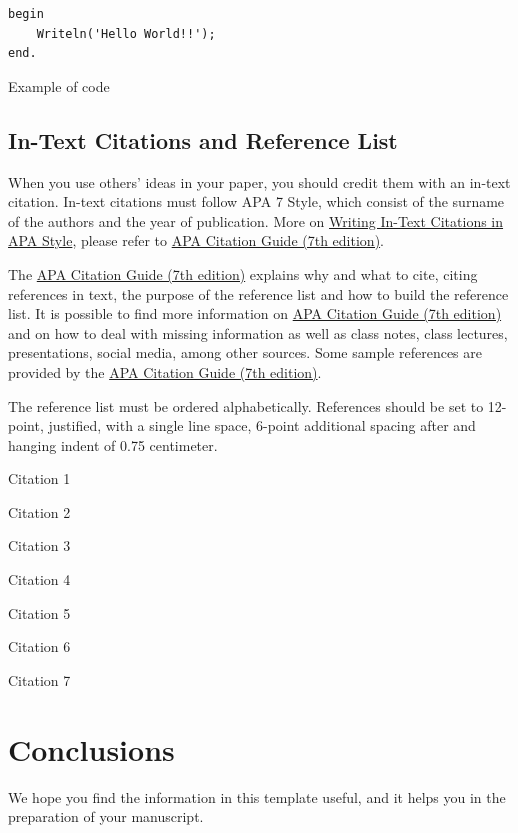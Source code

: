 \documentclass[english, spanish,brazilian]{RBIEarticle} %
\begin{document}
\begin{itemize}
\begin{code}[h]
	\begin{lstlisting}
begin
    Writeln('Hello World!!');
end.
	\end{lstlisting}
	\caption{Example of code}
	\label{code:one}
\end{code}


\subsection{In-Text Citations and Reference List}

When you use others' ideas in your paper, you should credit them with an in-text citation. In-text citations must follow APA 7 Style, which consist of the surname of the authors and the year of publication. More on \href{https://apastyle.apa.org/}{Writing In-Text Citations in APA Style}, please refer to \href{https://libguides.brenau.edu/APA7}{APA Citation Guide (7th edition)}.

The  \href{https://libguides.brenau.edu/APA7}{APA Citation Guide (7th edition)} explains why and what to cite, citing references in text, the purpose of the reference list and how to build the reference list. It is possible to find more information on  \href{https://libguides.brenau.edu/APA7}{APA Citation Guide (7th edition)} and on how to deal with missing information as well as class notes, class lectures, presentations, social media, among other sources. Some sample references are provided by the  \href{https://libguides.brenau.edu/APA7}{APA Citation Guide (7th edition)}.

The reference list must be ordered alphabetically. References should be set to 12-point, justified, with a single line space, 6-point additional spacing after and hanging indent of 0.75 centimeter.

Citation 1 \parencite{Baker2011}

Citation 2 \parencite{Seffrin2013}

Citation 3 \parencite{Brasil2008}

Citation 4 \parencite{Kautzman2015}

Citation 5 \parencite{Sweller1991}

Citation 6 \parencite{Clark2006}

Citation 7 \parencite{Mason2012}


\section{Conclusions}
We hope you find the information in this template useful, and it helps you in the preparation of your manuscript.


\end{itemize}
\end{document}
